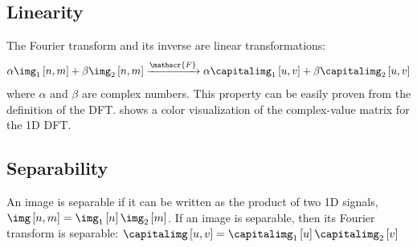 \subsection{Linearity}

The Fourier transform and its inverse are linear transformations:
\begin{equation}
	\alpha \img_1 \left[n,m \right] + \beta \img_2 \left[ n,m \right]
	\xrightarrow{\mathscr{F}}
	\alpha \capitalimg_1 \left[u,v \right] + \beta \capitalimg_2 \left[ u,v \right]
\end{equation}
where $\alpha$ and $\beta$ are complex numbers. This property can be easily proven from the definition of the DFT. \Fig{\ref{fig:colorDFT}} shows a color visualization of the complex-value matrix for the 1D DFT.

\subsection{Separability}

An image is separable if it can be written as the product of two 1D signals, $\img \left[n,m \right] = \img_1\left[n \right] \img_2\left[m \right]$. If an image is separable, then its Fourier transform is separable:
%
$\capitalimg \left[u,v \right] = \capitalimg_1 \left[u \right] \capitalimg_2 \left[v \right]$

